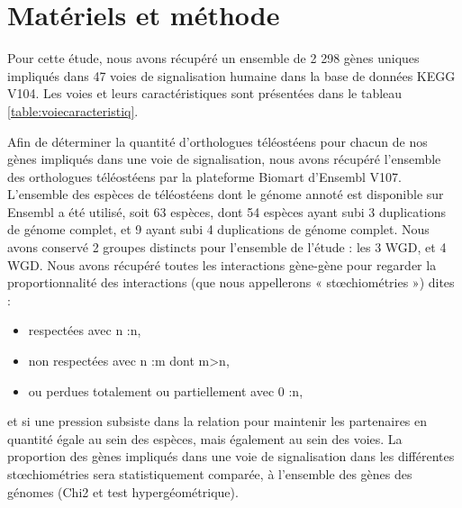 \section{Matériels et méthode}
\par Pour cette étude, nous avons récupéré un ensemble de 2 298 gènes uniques impliqués dans 47 voies de signalisation humaine dans la base de données KEGG V104. Les voies et leurs caractéristiques sont présentées dans le tableau \ref{table:voiecaracteristiq}.  
\par Afin de déterminer la quantité d’orthologues téléostéens pour chacun de nos gènes impliqués dans une voie de signalisation, nous avons récupéré l’ensemble des orthologues téléostéens par la plateforme Biomart d’Ensembl V107. L’ensemble des espèces de téléostéens dont le génome annoté est disponible sur Ensembl a été utilisé, soit 63 espèces, dont 54 espèces ayant subi 3 duplications de génome complet, et 9 ayant subi 4 duplications de génome complet. Nous avons conservé 2 groupes distincts pour l’ensemble de l’étude : les 3 WGD, et 4 WGD. Nous avons récupéré toutes les interactions gène-gène pour regarder la proportionnalité des interactions (que nous appellerons « stœchiométries ») dites :
\begin{itemize}
    \item respectées avec n :n,
    \item non respectées avec n :m dont m>n, 
    \item ou perdues totalement ou partiellement avec 0 :n,
\end{itemize}
et si une pression subsiste dans la relation pour maintenir les partenaires en quantité égale au sein des espèces, mais également au sein des voies. La proportion des gènes impliqués dans une voie de signalisation dans les différentes stœchiométries sera statistiquement comparée, à l’ensemble des gènes des génomes (Chi2 et test hypergéométrique). 

